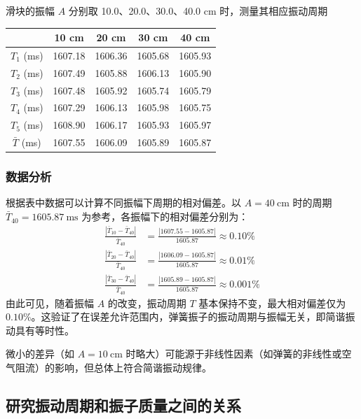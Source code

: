 \documentclass[11pt]{article}
\begin{document}
滑块的振幅 $A$ 分别取 10.0、20.0、30.0、40.0 cm 时，测量其相应振动周期

\begin{table}[h]
    \centering
    \begin{tabular}{ccccc}
        \toprule
        & 10 cm & 20 cm & 30 cm & 40 cm \\
        \midrule
        $T_1$ (ms) & 1607.18 & 1606.36 & 1605.68 & 1605.93 \\
        $T_2$ (ms) & 1607.49 & 1605.88 & 1606.13 & 1605.90 \\
        $T_3$ (ms) & 1607.48 & 1605.92 & 1605.74 & 1605.79 \\
        $T_4$ (ms) & 1607.29 & 1606.13 & 1605.98 & 1605.75 \\
        $T_5$ (ms) & 1608.90 & 1606.17 & 1605.93 & 1605.97 \\
        \midrule
        $\bar{T}$ (ms) & 1607.55 & 1606.09 & 1605.89 & 1605.87 \\
        \bottomrule
    \end{tabular}
\end{table}

\subsubsection{数据分析}
根据表中数据可以计算不同振幅下周期的相对偏差。以 $A=40\ \mathrm{cm}$ 时的周期 $\bar{T}_{40}=1605.87\ \mathrm{ms}$ 为参考，各振幅下的相对偏差分别为：
\begin{align*}
\frac{|\bar{T}_{10}-\bar{T}_{40}|}{\bar{T}_{40}} &= \frac{|1607.55-1605.87|}{1605.87} \approx 0.10\% \\
\frac{|\bar{T}_{20}-\bar{T}_{40}|}{\bar{T}_{40}} &= \frac{|1606.09-1605.87|}{1605.87} \approx 0.01\% \\
\frac{|\bar{T}_{30}-\bar{T}_{40}|}{\bar{T}_{40}} &= \frac{|1605.89-1605.87|}{1605.87} \approx 0.001\%
\end{align*}
由此可见，随着振幅 $A$ 的改变，振动周期 $T$ 基本保持不变，最大相对偏差仅为 $0.10\%$。这验证了在误差允许范围内，弹簧振子的振动周期与振幅无关，即简谐振动具有等时性。

微小的差异（如 $A=10\ \mathrm{cm}$ 时略大）可能源于非线性因素（如弹簧的非线性或空气阻流）的影响，但总体上符合简谐振动规律。

\subsection{研究振动周期和振子质量之间的关系}
\end{document}
